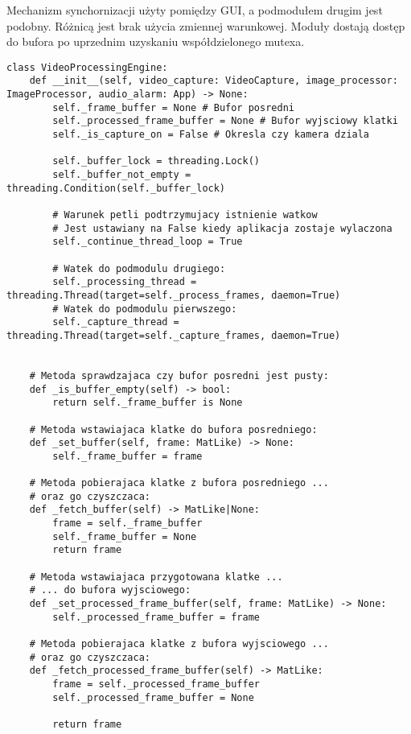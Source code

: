 Mechanizm synchornizacji użyty pomiędzy GUI, a podmodułem drugim jest podobny. Różnicą jest brak użycia zmiennej warunkowej. Moduły dostają dostęp do bufora po uprzednim uzyskaniu współdzielonego mutexa. 


\begin{lstlisting}[caption={Kod modułu silnika przetwarzania wideo z zawartymi mechanizami synchronizacji}, label={lst:engine-1}]
class VideoProcessingEngine:
    def __init__(self, video_capture: VideoCapture, image_processor: ImageProcessor, audio_alarm: App) -> None:
        self._frame_buffer = None # Bufor posredni
        self._processed_frame_buffer = None # Bufor wyjsciowy klatki
        self._is_capture_on = False # Okresla czy kamera dziala

        self._buffer_lock = threading.Lock()
        self._buffer_not_empty = threading.Condition(self._buffer_lock)

        # Warunek petli podtrzymujacy istnienie watkow 
        # Jest ustawiany na False kiedy aplikacja zostaje wylaczona
        self._continue_thread_loop = True

        # Watek do podmodulu drugiego:
        self._processing_thread = threading.Thread(target=self._process_frames, daemon=True)
        # Watek do podmodulu pierwszego:
        self._capture_thread = threading.Thread(target=self._capture_frames, daemon=True)
        

    # Metoda sprawdzajaca czy bufor posredni jest pusty:
    def _is_buffer_empty(self) -> bool:
        return self._frame_buffer is None 
    
    # Metoda wstawiajaca klatke do bufora posredniego:
    def _set_buffer(self, frame: MatLike) -> None:
        self._frame_buffer = frame
    
    # Metoda pobierajaca klatke z bufora posredniego ... 
    # oraz go czyszczaca:
    def _fetch_buffer(self) -> MatLike|None:
        frame = self._frame_buffer
        self._frame_buffer = None
        return frame

    # Metoda wstawiajaca przygotowana klatke ... 
    # ... do bufora wyjsciowego:
    def _set_processed_frame_buffer(self, frame: MatLike) -> None:
        self._processed_frame_buffer = frame

    # Metoda pobierajaca klatke z bufora wyjsciowego ... 
    # oraz go czyszczaca:
    def _fetch_processed_frame_buffer(self) -> MatLike:
        frame = self._processed_frame_buffer
        self._processed_frame_buffer = None

        return frame


\end{lstlisting}
